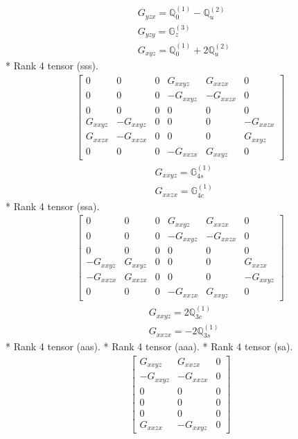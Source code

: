 \documentclass[fleqn,8pt,landscape]{jsarticle}
\begin{document}
\begin{align*}
& G_{yzx} = \mathbb{Q}_{0}^{(1)} - \mathbb{Q}_{u}^{(2)} \\
& G_{yzy} = \mathbb{G}_{z}^{(3)} \\
& G_{xyz} = \mathbb{Q}_{0}^{(1)} + 2 \mathbb{Q}_{u}^{(2)}
\end{align*}
* Rank 4 tensor (sss).
\begin{align*}
\begin{bmatrix} 0 & 0 & 0 & G_{xxyz} & G_{xxzx} & 0 \\ 0 & 0 & 0 & - G_{xxyz} & - G_{xxzx} & 0 \\ 0 & 0 & 0 & 0 & 0 & 0 \\ G_{xxyz} & - G_{xxyz} & 0 & 0 & 0 & - G_{xxzx} \\ G_{xxzx} & - G_{xxzx} & 0 & 0 & 0 & G_{xxyz} \\ 0 & 0 & 0 & - G_{xxzx} & G_{xxyz} & 0 \end{bmatrix}
\end{align*}
\begin{align*}
& G_{xxyz} = \mathbb{G}_{4s}^{(1)} \\
& G_{xxzx} = \mathbb{G}_{4c}^{(1)}
\end{align*}
* Rank 4 tensor (ssa).
\begin{align*}
\begin{bmatrix} 0 & 0 & 0 & G_{xxyz} & G_{xxzx} & 0 \\ 0 & 0 & 0 & - G_{xxyz} & - G_{xxzx} & 0 \\ 0 & 0 & 0 & 0 & 0 & 0 \\ - G_{xxyz} & G_{xxyz} & 0 & 0 & 0 & G_{xxzx} \\ - G_{xxzx} & G_{xxzx} & 0 & 0 & 0 & - G_{xxyz} \\ 0 & 0 & 0 & - G_{xxzx} & G_{xxyz} & 0 \end{bmatrix}
\end{align*}
\begin{align*}
& G_{xxyz} = 2 \mathbb{Q}_{3c}^{(1)} \\
& G_{xxzx} = - 2 \mathbb{Q}_{3s}^{(1)}
\end{align*}
* Rank 4 tensor (aas).
* Rank 4 tensor (aaa).
* Rank 4 tensor (sa).
\begin{align*}
\begin{bmatrix} G_{xxyz} & G_{xxzx} & 0 \\ - G_{xxyz} & - G_{xxzx} & 0 \\ 0 & 0 & 0 \\ 0 & 0 & 0 \\ 0 & 0 & 0 \\ G_{xxzx} & - G_{xxyz} & 0 \end{bmatrix}
\end{align*}
\end{document}
